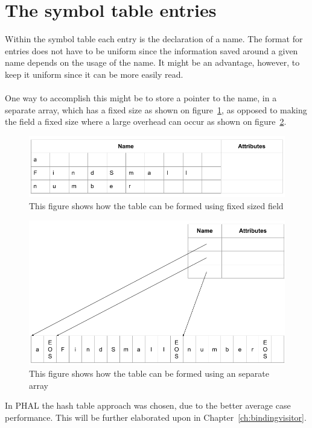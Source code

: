 \section{The symbol table entries}
Within the symbol table each entry is the declaration of a name. 
The format for entries does not have to be uniform since the information saved around a given name depends on the usage of the name. 
It might be an advantage, however, to keep it uniform since it can be more easily read.
\\\\
One way to accomplish this might be to store a pointer to the name, in a separate array, which has a fixed size as shown on figure~\ref{fig:FixedSize}, as opposed to making the field a fixed size where a large overhead can occur as shown on figure~\ref{fig:SeparateArray}.
\begin{figure}[H]
\centering
  \includegraphics[width=\textwidth]{figures/FixedSize.png}
  \caption{This figure shows how the table can be formed using fixed sized field \cite{Dragon}}
  \label{fig:FixedSize}
\end{figure}
\begin{figure}[H]
\centering
  \includegraphics[width=\textwidth]{figures/InSeparateArray.png}
  \caption{This figure shows how the table can be formed using an separate array \cite{Dragon}}
  \label{fig:SeparateArray}
\end{figure}
\noindent
In PHAL the hash table approach was chosen, due to the better average case performance. This will be further elaborated upon in Chapter~\ref{ch:bindingvisitor}.